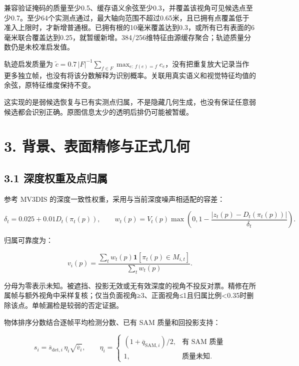 \documentclass[UTF8,fontset=fandol]{ctexart}
\begin{document}
兼容验证掩码的质量至少0.5、缓存语义余弦至少0.3，并覆盖该视角可见候选点至少0.7。至少64个实测点通过，最大轴向范围不超过0.65米，且已拥有点覆盖低于准入上限时，才新增普通根。已拥有根的10毫米覆盖达到0.3，或所有已有表面的6毫米联合覆盖达到0.25，就暂缓新增。384/256维特征由源缓存聚合；轨迹质量分数仍是未校准启发值。



轨迹启发质量为 $\tilde c=0.7\,|F|^{-1}\sum_{f\in F}\max_{e:\,f(e)=f}c_e$，没有把重复放大记录当作更多独立帧，也没有将该分数解释为识别概率。关联用真实语义和视觉特征均值的余弦，原特征维度保持不变。



这实现的是弱候选恢复与已有实测点归属，不是隐藏几何生成，也没有保证任意弱候选都会识别正确。原图信息太少的透明后排仍可能被暂缓。



\section*{3. 背景、表面精修与正式几何}

\subsection*{3.1 深度权重及点归属}

参考 MV3DIS 的深度一致性权重，采用与当前深度噪声相适配的容差：



\[
\delta_t=0.025+0.01D_t(\pi_t(p)),\qquad
w_t(p)=V_t(p)\max\left(0,1-\frac{|z_t(p)-D_t(\pi_t(p))|}{\delta_t}\right).
\]

归属可靠度为：



\[
v_i(p)=\frac{\sum_tw_t(p)\mathbf1[\pi_t(p)\in M_{i,t}]}{\sum_tw_t(p)}.
\]

分母为零表示未知。被遮挡、投影无效或无有效深度的视角不投反对票。精修在所属帧与额外视角中采样复核；仅当负面视角≥3、正面视角≤1且归属比例<0.35时删除该点。单帧漏检是较弱的否定证据。



物体排序分数结合逐帧平均检测分数、已有 SAM 质量和回投影支持：



\[
s_i=\overline{s}_{\mathrm{det},i}\,\eta_i\sqrt{\overline v_i},\qquad
\eta_i=\begin{cases}(1+\overline q_{\mathrm{SAM},i})/2,&\text{有 SAM 质量}\\1,&\text{质量未知}.\end{cases}
\]
\end{document}
